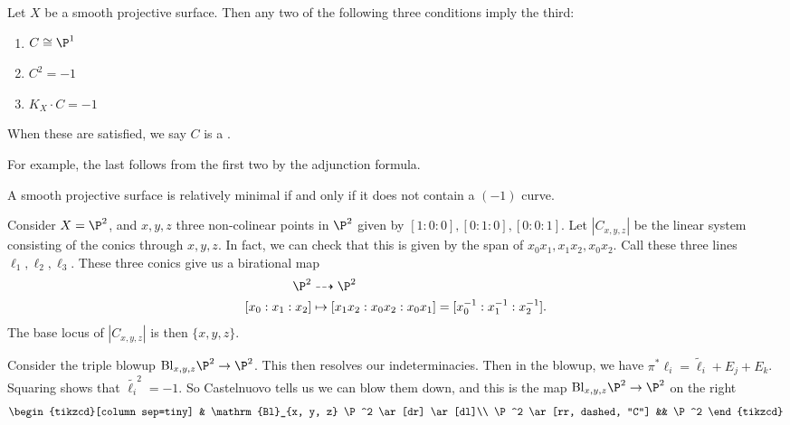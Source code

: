\documentclass[a4paper]{article}
\newcommand\Bl{\mathrm{Bl}}
\begin{document}
\begin{ex}
  Let $X$ be a smooth projective surface. Then any two of the following three conditions imply the third:
  \begin{enumerate}
    \item $C \cong \P^1$
    \item $C^2 = -1$
    \item $K_X \cdot C = -1$
  \end{enumerate}
  When these are satisfied, we say $C$ is a .
\end{ex}
For example, the last follows from the first two by the adjunction formula.

\begin{cor}
  A smooth projective surface is relatively minimal if and only if it does not contain a $(-1)$ curve.
\end{cor}

\begin{eg}
  Consider $X = \P^2$, and $x, y, z$ three non-colinear points in $\P^2$ given by $[1:0:0], [0:1:0], [0:0:1]$. Let $|C_{x, y, z}|$ be the linear system consisting of the conics through $x, y, z$. In fact, we can check that this is given by the span of $x_0 x_1, x_1 x_2, x_0 x_2$. Call these three lines $\ell_1, \ell_2, \ell_3$. These three conics give us a birational map
  \begin{align*}
    \P^2 &\dashrightarrow \P^2\\
    [x_0:x_1:x_2] & \mapsto [x_1 x_2: x_0 x_2: x_0 x_1] = [x_0^{-1}:x_1^{-1}:x_2^{-1}].
  \end{align*}
  The base locus of $|C_{x, y, z}|$ is then $\{x, y, z\}$.

  Consider the triple blowup $\Bl_{x, y, z} \P^2 \to \P^2$. This then resolves our indeterminacies. Then in the blowup, we have $\pi^* \ell_i = \tilde{\ell}_i + E_j + E_k$. Squaring shows that $\tilde{\ell_i}^2 = -1$. So Castelnuovo tells us we can blow them down, and this is the map $\Bl_{x, y, z} \P^2 \to \P^2$ on the right %
  \[
    \begin{tikzcd}[column sep=tiny]
      & \Bl_{x, y, z} \P^2 \ar[dr] \ar[dl]\\
      \P^2 \ar[rr, dashed, "C"] && \P^2
    \end{tikzcd}
  \]
\end{eg}
\end{document}

